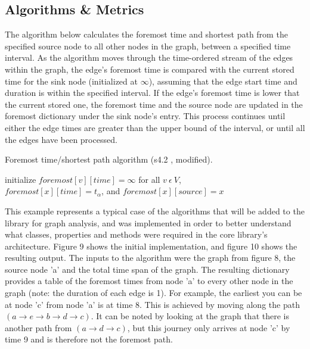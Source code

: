 \begin{design}
\subsection{Algorithms \& Metrics}

The algorithm below calculates the foremost time and shortest path from the specified source node to all other nodes in the graph, between a specified time interval. As the algorithm moves through the time-ordered stream of the edges within the graph, the edge's foremost time is compared with the current stored time for the sink node (initialized at $\infty$), assuming that the edge start time and duration is within the specified interval. If the edge's foremost time is lower that the current stored one, the foremost time and the source node are updated in the foremost dictionary under the sink node's entry. This process continues until either the edge times are greater than the upper bound of the interval, or until all the edges have been processed.\\
\begin{algorithm}[H]
\SetAlgoLined
\caption{Foremost time/shortest path algorithm (s4.2 \cite{efficient_algorithms}, modified).}
 initialize $foremost[v][time]=\infty$ for all $v\ \epsilon\ V$, \\
 \hspace{1.5cm}$foremost[x][time]=t_\alpha$, and $foremost[x][source]=x$\;
 \;
\end{algorithm}
\vspace{0.1cm}
This example represents a typical case of the algorithms that will be added to the library for graph analysis, and was implemented in order to better understand what classes, properties and methods were required in the core library's architecture. Figure 9 shows the initial implementation, and figure 10 shows the resulting output. The inputs to the algorithm were the graph from figure 8, the source node 'a' and the total time span of the graph. The resulting dictionary provides a table of the foremost times from node 'a' to every other node in the graph (note: the duration of each edge is 1). For example, the earliest you can be at node 'c' from node 'a' is at time 8. This is achieved by moving along the path $(a \to e \to b \to d \to c )$. It can be noted by looking at the graph that there is another path from $(a \to d \to c)$, but this journey only arrives at node 'c' by time 9 and is therefore not the foremost path.

\end{design}
